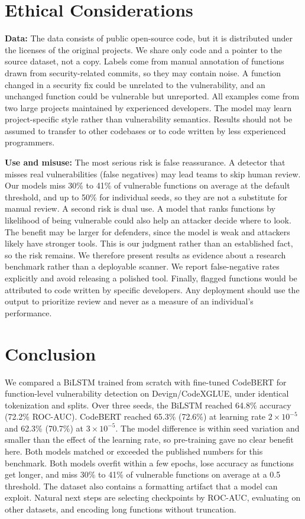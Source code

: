 \documentclass{article}
\begin{document}
\section{Ethical Considerations}

\textbf{Data:}
The data consists of public open-source code, but it is distributed under the licenses of the original projects. We share only code and a pointer to the source dataset, not a copy.
Labels come from manual annotation of functions drawn from security-related commits, so they may contain noise. A function changed in a security fix could be unrelated to the vulnerability, and an unchanged function could be vulnerable but unreported.
All examples come from two large projects maintained by experienced developers. The model may learn project-specific style rather than vulnerability semantics. Results should not be assumed to transfer to other codebases or to code written by less experienced programmers.

\textbf{Use and misuse:}
The most serious risk is false reassurance. A detector that misses real vulnerabilities (false negatives) may lead teams to skip human review. Our models miss 30\% to 41\% of vulnerable functions on average at the default threshold, and up to 50\% for individual seeds, so they are not a substitute for manual review.
A second risk is dual use. A model that ranks functions by likelihood of being vulnerable could also help an attacker decide where to look. The benefit may be larger for defenders, since the model is weak and attackers likely have stronger tools. This is our judgment rather than an established fact, so the risk remains.
We therefore present results as evidence about a research benchmark rather than a deployable scanner. We report false-negative rates explicitly and avoid releasing a polished tool.
Finally, flagged functions would be attributed to code written by specific developers. Any deployment should use the output to prioritize review and never as a measure of an individual's performance.

\section{Conclusion}

We compared a BiLSTM trained from scratch with fine-tuned CodeBERT for function-level vulnerability detection on Devign/CodeXGLUE, under identical tokenization and splits.
Over three seeds, the BiLSTM reached 64.8\% accuracy (72.2\% ROC-AUC). CodeBERT reached 65.3\% (72.6\%) at learning rate $2\times10^{-5}$ and 62.3\% (70.7\%) at $3\times10^{-5}$. The model difference is within seed variation and smaller than the effect of the learning rate, so pre-training gave no clear benefit here. Both models matched or exceeded the published numbers for this benchmark.
Both models overfit within a few epochs, lose accuracy as functions get longer, and miss 30\% to 41\% of vulnerable functions on average at a 0.5 threshold. The dataset also contains a formatting artifact that a model can exploit.
Natural next steps are selecting checkpoints by ROC-AUC, evaluating on other datasets, and encoding long functions without truncation.
\end{document}
